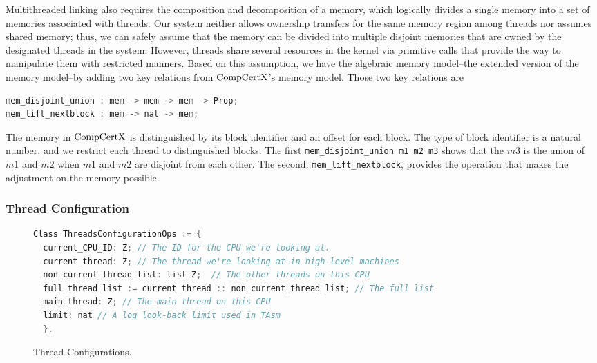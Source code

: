 Multithreaded linking also requires the composition and decomposition of a memory,
which logically divides a single memory into a set of memories associated with threads.
Our system neither allows ownership transfers for the same memory region among threads nor assumes shared memory; thus, we can safely assume that the memory can be divided into multiple disjoint memories that are owned by the designated threads in the system. 
However, threads share several resources in the kernel via primitive calls that provide the way to manipulate them with restricted manners. 
Based on this assumption, 
we have  the algebraic memory model--the extended version of the memory model--by adding two key relations from $\mathrm{CompCertX}$'s memory model.
Those two key relations are 
\begin{lstlisting}[language=C]
mem_disjoint_union : mem -> mem -> mem -> Prop;
mem_lift_nextblock : mem -> nat -> mem;
\end{lstlisting}
The memory in $\mathrm{CompCertX}$ is distinguished by its block identifier and an offset for each block. 
The type of block identifier is a natural number,
and we restrict each thread to distinguished blocks.  
The first \lstinline$mem_disjoint_union m1 m2 m3$  shows that 
the $m3$ is the union of $m1$ and $m2$ when $m1$ and $m2$ 
are disjoint from each other. 
The second, \lstinline$mem_lift_nextblock$,
provides the operation that makes the adjustment on the memory possible. 



\subsubsection{Thread Configuration}

\begin{figure}
\begin{lstlisting}[language=C, morekeywords={Class}]
Class ThreadsConfigurationOps := {      
  current_CPU_ID: Z; // The ID for the CPU we're looking at. 
  current_thread: Z; // The thread we're looking at in high-level machines
  non_current_thread_list: list Z;  // The other threads on this CPU 
  full_thread_list := current_thread :: non_current_thread_list; // The full list
  main_thread: Z; // The main thread on this CPU 
  limit: nat // A log look-back limit used in TAsm 
  }.
\end{lstlisting}
\caption{Thread Configurations.}
\label{fig:chapter:linking:thread-configurations}
\end{figure}



